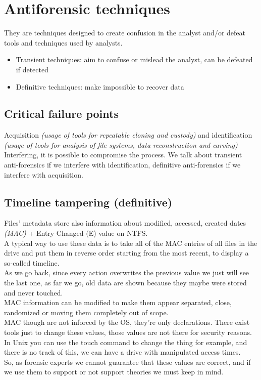 \section{Antiforensic techniques}
    They are techniques designed to create confusion in the analyst and/or defeat tools and techniques used by analysts.
    \begin{itemize}
        \item Transient techniques: aim to confuse or mislead the analyst, can be defeated if detected
        \item Definitive techniques: make impossible to recover data
    \end{itemize}
    \subsection{Critical failure points}
        Acquisition \textit{(usage of tools for repeatable cloning and custody)} and identification \textit{(usage of tools for analysis of file systems, data reconstruction and carving)}
        Interfering, it is possible to compromise the process. We talk about transient anti-forensics if we interfere with identification, definitive anti-forensics if we interfere with acquisition.
    \subsection{Timeline tampering (definitive)}
        Files' metadata store also information about modified, accessed, created dates \textit{(MAC)} + Entry Changed (E) value on NTFS.\\
        A typical way to use these data is to take all of the MAC entries of all files in the drive and put them in reverse order starting from the most recent, to display a so-called timeline.\\
        As we go back, since every action overwrites the previous value we just will see the last one, as far we go, old data are shown because they maybe were stored and never touched.\\
        MAC information can be modified to make them appear separated, close, randomized or moving them completely out of scope.\\
        MAC though are not inforced by the OS, they're only declarations. There exist tools just to change these values, those values are not there for security reasons.
        In Unix you can use the touch command to change the thing for example, and there is no track of this, we can have a drive with manipulated access times.\\
        So, as forensic experts we cannot guarantee that these values are correct, and if we use them to support or not support theories we must keep in mind.
